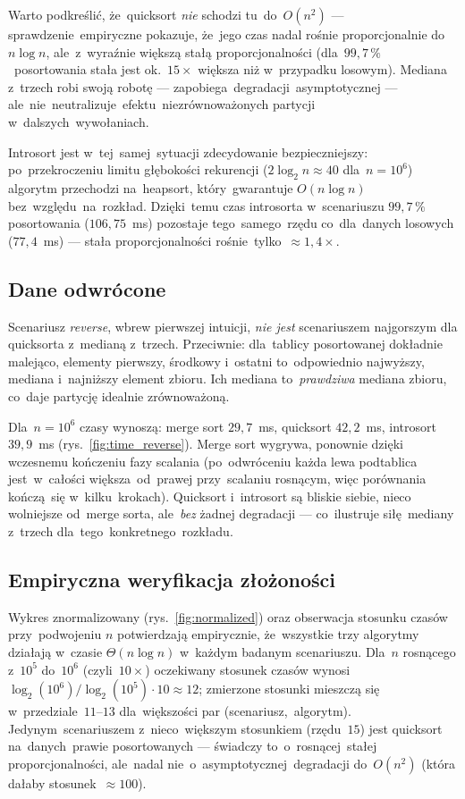 \documentclass[11pt,a4paper]{article}
\begin{document}
Warto podkreślić, że~quicksort \emph{nie} schodzi tu~do~$O(n^2)$ --- sprawdzenie~empiryczne
pokazuje, że~jego czas nadal rośnie proporcjonalnie do~$n\log n$, ale~z~wyraźnie większą stałą
proporcjonalności (dla~$99{,}7\,\%$~posortowania stała jest ok.~$15\!\times$ większa niż
w~przypadku losowym). Mediana z~trzech robi swoją robotę --- zapobiega~degradacji~asymptotycznej ---
ale~nie~neutralizuje~efektu~niezrównoważonych partycji w~dalszych~wywołaniach.

Introsort jest w~tej~samej~sytuacji zdecydowanie bezpieczniejszy: po~przekroczeniu limitu
głębokości rekurencji ($2\log_2 n \approx 40$ dla~$n=10^6$) algorytm przechodzi na~heapsort,
który~gwarantuje $O(n\log n)$ bez~względu~na~rozkład. Dzięki~temu czas introsorta w~scenariuszu
$99{,}7\,\%$ posortowania ($106{,}75$~ms) pozostaje tego~samego~rzędu co~dla~danych losowych
($77{,}4$~ms) --- stała proporcjonalności rośnie~tylko~$\approx\! 1{,}4\!\times$.

\subsection{Dane odwrócone}

Scenariusz \emph{reverse}, wbrew pierwszej intuicji, \emph{nie jest} scenariuszem najgorszym dla
quicksorta z~medianą z~trzech. Przeciwnie: dla~tablicy posortowanej dokładnie malejąco, elementy
pierwszy, środkowy i~ostatni to~odpowiednio najwyższy, mediana i~najniższy element zbioru. Ich
mediana to~\emph{prawdziwa} mediana zbioru, co~daje partycję idealnie zrównoważoną.

Dla~$n=10^6$ czasy wynoszą: merge sort $29{,}7$~ms, quicksort $42{,}2$~ms, introsort $39{,}9$~ms
(rys.~\ref{fig:time_reverse}). Merge sort wygrywa, ponownie dzięki wczesnemu kończeniu fazy
scalania (po~odwróceniu każda lewa podtablica jest~w~całości większa~od~prawej przy~scalaniu
rosnącym, więc porównania kończą~się w~kilku~krokach). Quicksort i~introsort są bliskie siebie,
nieco wolniejsze od~merge sorta, ale~\emph{bez} żadnej degradacji --- co~ilustruje siłę~mediany
z~trzech dla~tego~konkretnego~rozkładu.

\subsection{Empiryczna weryfikacja złożoności}

Wykres znormalizowany (rys.~\ref{fig:normalized}) oraz obserwacja stosunku czasów przy~podwojeniu
$n$ potwierdzają empirycznie, że~wszystkie trzy algorytmy działają w~czasie $\Theta(n\log n)$
w~każdym badanym scenariuszu. Dla~$n$ rosnącego z~$10^5$ do~$10^6$ (czyli~$10\times$) oczekiwany
stosunek czasów wynosi~$\log_2(10^6)/\log_2(10^5) \cdot 10 \approx 12$; zmierzone stosunki mieszczą
się w~przedziale~$11$--$13$ dla~większości par (scenariusz,~algorytm). Jedynym~scenariuszem
z~nieco~większym stosunkiem (rzędu~$15$) jest quicksort na~danych~prawie posortowanych ---
świadczy to~o~rosnącej~stałej proporcjonalności, ale~nadal nie~o~asymptotycznej~degradacji do~$O(n^2)$
(która dałaby stosunek~$\approx\! 100$).
\end{document}
